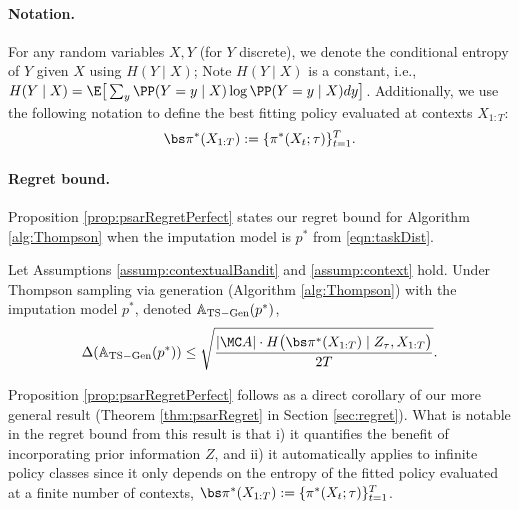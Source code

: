 \paragraph{Notation.}
For any random variables $X, Y$ (for $Y$ discrete), we denote the conditional entropy of $Y$ given $X$ using $H(Y \mid X)$; Note $H(Y \mid X)$ is a constant, i.e., $H(Y \mid X) = \E \big[ \sum_y \PP( Y = y \mid X) \log \PP( Y = y \mid X) dy \big]$.
Additionally, we use the following notation to define the best fitting policy evaluated at contexts $X_{1:T}$:
\begin{align}
    \label{eqn:piXdef}
    \piX := \{ \pi^*(X_t; \tau) \}_{t=1}^T.
\end{align}

\paragraph{Regret bound.}
Proposition \ref{prop:psarRegretPerfect} states our regret bound for Algorithm \ref{alg:Thompson} when the imputation model is $p^*$ from \eqref{eqn:taskDist}.
\begin{proposition}
    \label{prop:psarRegretPerfect}
    Let Assumptions \ref{assump:contextualBandit} and \ref{assump:context} hold. Under Thompson sampling via generation (Algorithm \ref{alg:Thompson}) with the imputation model $p^*$, 
    denoted $\mathbb{A}_{\rm{TS-Gen}}(p^*)$, 
    \begin{align*}
        \Delta( \mathbb{A}_{\rm{TS-Gen}}(p^*) ) \leq \sqrt{ \frac{ |\Aeval| \cdot H \big( \piX \mid Z_{\tau}, X_{1:T} \big) }{2 T} }.
    \end{align*}
\end{proposition}
Proposition \ref{prop:psarRegretPerfect} follows as a direct corollary of our more general result (Theorem \ref{thm:psarRegret} in Section \ref{sec:regret}).  
What is notable in the regret bound from this result is that i) it quantifies the benefit of incorporating prior information $Z$, and ii) it automatically applies to infinite policy classes since it only depends on the entropy of the fitted policy evaluated at a finite number of contexts, $\piX := \{ \pi^*(X_t; \tau) \}_{t=1}^T$. 


